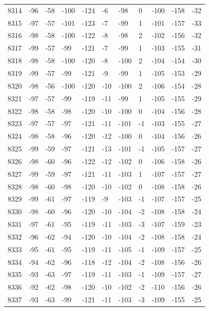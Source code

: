 \begin{table}[H]
\begin{tabular}{lllllllllll}
8314 & -96 & -58 & -100 & -124 & -6 & -98 & 0 & -100 & -158 & -32 \\
8315 & -97 & -57 & -101 & -123 & -7 & -99 & 1 & -101 & -157 & -33 \\
8316 & -98 & -58 & -100 & -122 & -8 & -98 & 2 & -102 & -156 & -32 \\
8317 & -99 & -57 & -99 & -121 & -7 & -99 & 1 & -103 & -155 & -31 \\
8318 & -98 & -58 & -100 & -120 & -8 & -100 & 2 & -104 & -154 & -30 \\
8319 & -99 & -57 & -99 & -121 & -9 & -99 & 1 & -105 & -153 & -29 \\
8320 & -98 & -56 & -100 & -120 & -10 & -100 & 2 & -106 & -154 & -28 \\
8321 & -97 & -57 & -99 & -119 & -11 & -99 & 1 & -105 & -155 & -29 \\
8322 & -98 & -58 & -98 & -120 & -10 & -100 & 0 & -104 & -156 & -28 \\
8323 & -97 & -57 & -97 & -121 & -11 & -101 & -1 & -103 & -155 & -27 \\
8324 & -98 & -58 & -96 & -120 & -12 & -100 & 0 & -104 & -156 & -26 \\
8325 & -99 & -59 & -97 & -121 & -13 & -101 & -1 & -105 & -157 & -27 \\
8326 & -98 & -60 & -96 & -122 & -12 & -102 & 0 & -106 & -158 & -26 \\
8327 & -99 & -59 & -97 & -121 & -11 & -103 & 1 & -107 & -157 & -27 \\
8328 & -98 & -60 & -98 & -120 & -10 & -102 & 0 & -108 & -158 & -26 \\
8329 & -99 & -61 & -97 & -119 & -9 & -103 & -1 & -107 & -157 & -25 \\
8330 & -98 & -60 & -96 & -120 & -10 & -104 & -2 & -108 & -158 & -24 \\
8331 & -97 & -61 & -95 & -119 & -11 & -103 & -3 & -107 & -159 & -23 \\
8332 & -96 & -62 & -94 & -120 & -10 & -104 & -2 & -108 & -158 & -24 \\
8333 & -95 & -61 & -95 & -119 & -11 & -105 & -1 & -109 & -157 & -25 \\
8334 & -94 & -62 & -96 & -118 & -12 & -104 & -2 & -108 & -156 & -26 \\
8335 & -93 & -63 & -97 & -119 & -11 & -103 & -1 & -109 & -157 & -27 \\
8336 & -92 & -62 & -98 & -120 & -10 & -102 & -2 & -110 & -156 & -26 \\
8337 & -93 & -63 & -99 & -121 & -11 & -103 & -3 & -109 & -155 & -25 \\

\end{tabular}
\end{table}
